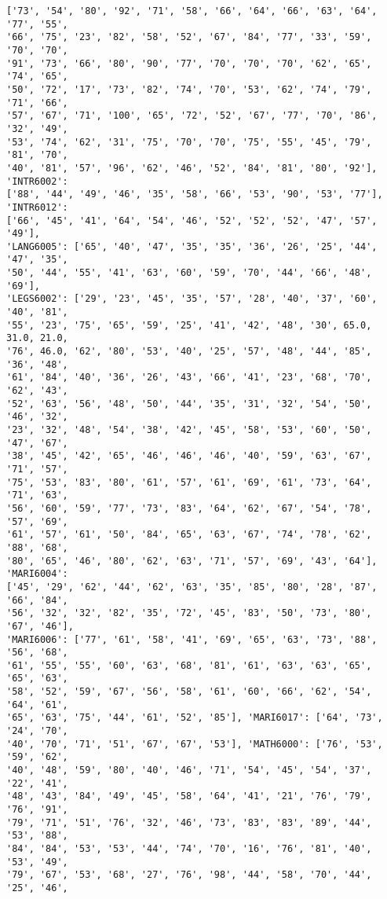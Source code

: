 \documentclass[11pt]{article}
\begin{document}
\begin{Verbatim}[commandchars=\\\{\}]
['73', '54', '80', '92', '71', '58', '66', '64', '66', '63', '64', '77', '55',
'66', '75', '23', '82', '58', '52', '67', '84', '77', '33', '59', '70', '70',
'91', '73', '66', '80', '90', '77', '70', '70', '70', '62', '65', '74', '65',
'50', '72', '17', '73', '82', '74', '70', '53', '62', '74', '79', '71', '66',
'57', '67', '71', '100', '65', '72', '52', '67', '77', '70', '86', '32', '49',
'53', '74', '62', '31', '75', '70', '70', '75', '55', '45', '79', '81', '70',
'40', '81', '57', '96', '62', '46', '52', '84', '81', '80', '92'], 'INTR6002':
['88', '44', '49', '46', '35', '58', '66', '53', '90', '53', '77'], 'INTR6012':
['66', '45', '41', '64', '54', '46', '52', '52', '52', '47', '57', '49'],
'LANG6005': ['65', '40', '47', '35', '35', '36', '26', '25', '44', '47', '35',
'50', '44', '55', '41', '63', '60', '59', '70', '44', '66', '48', '69'],
'LEGS6002': ['29', '23', '45', '35', '57', '28', '40', '37', '60', '40', '81',
'55', '23', '75', '65', '59', '25', '41', '42', '48', '30', 65.0, 31.0, 21.0,
'76', 46.0, '62', '80', '53', '40', '25', '57', '48', '44', '85', '36', '48',
'61', '84', '40', '36', '26', '43', '66', '41', '23', '68', '70', '62', '43',
'52', '63', '56', '48', '50', '44', '35', '31', '32', '54', '50', '46', '32',
'23', '32', '48', '54', '38', '42', '45', '58', '53', '60', '50', '47', '67',
'38', '45', '42', '65', '46', '46', '46', '40', '59', '63', '67', '71', '57',
'75', '53', '83', '80', '61', '57', '61', '69', '61', '73', '64', '71', '63',
'56', '60', '59', '77', '73', '83', '64', '62', '67', '54', '78', '57', '69',
'61', '57', '61', '50', '84', '65', '63', '67', '74', '78', '62', '88', '68',
'80', '65', '46', '80', '62', '63', '71', '57', '69', '43', '64'], 'MARI6004':
['45', '29', '62', '44', '62', '63', '35', '85', '80', '28', '87', '66', '84',
'56', '32', '32', '82', '35', '72', '45', '83', '50', '73', '80', '67', '46'],
'MARI6006': ['77', '61', '58', '41', '69', '65', '63', '73', '88', '56', '68',
'61', '55', '55', '60', '63', '68', '81', '61', '63', '63', '65', '65', '63',
'58', '52', '59', '67', '56', '58', '61', '60', '66', '62', '54', '64', '61',
'65', '63', '75', '44', '61', '52', '85'], 'MARI6017': ['64', '73', '24', '70',
'40', '70', '71', '51', '67', '67', '53'], 'MATH6000': ['76', '53', '59', '62',
'40', '48', '59', '80', '40', '46', '71', '54', '45', '54', '37', '22', '41',
'48', '43', '84', '49', '45', '58', '64', '41', '21', '76', '79', '76', '91',
'79', '71', '51', '76', '32', '46', '73', '83', '83', '89', '44', '53', '88',
'84', '84', '53', '53', '44', '74', '70', '16', '76', '81', '40', '53', '49',
'79', '67', '53', '68', '27', '76', '98', '44', '58', '70', '44', '25', '46',

\end{Verbatim}
\end{document}
